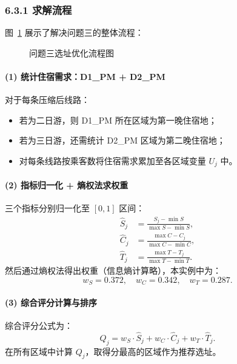 \documentclass[12pt,a4paper]{article}
\begin{document}
\subsubsection*{6.3.1 求解流程} 图~\ref{fig:flow3} 展示了解决问题三的整体流程：
\begin{figure}[H]
\centering
{}
\caption{问题三选址优化流程图}\label{fig:flow3}
\end{figure}

\paragraph{(1) 统计住宿需求：D1\_PM + D2\_PM}
对于每条压缩后线路：
\begin{itemize}
  \item 若为二日游，则 D1\_PM 所在区域为第一晚住宿地；
  \item 若为三日游，还需统计 D2\_PM 区域为第二晚住宿地；
  \item 对每条线路按乘客数将住宿需求累加至各区域变量 $U_j$ 中。
\end{itemize}

\paragraph{(2) 指标归一化 + 熵权法求权重}
三个指标分别归一化至 $[0,1]$ 区间：
\begin{align*}
\hat{S}_j &= \frac{S_j - \min S}{\max S - \min S}, \\
\hat{C}_j &= \frac{\max C - C_j}{\max C - \min C}, \\
\hat{T}_j &= \frac{\max T - T_j}{\max T - \min T}.
\end{align*}
然后通过熵权法得出权重（信息熵计算略），本实例中为：
\[
w_S = 0.372,\quad w_C = 0.342,\quad w_T = 0.287.
\]

\paragraph{(3) 综合评分计算与排序}
综合评分公式为：
\[
Q_j = w_S \cdot \hat{S}_j + w_C \cdot \hat{C}_j + w_T \cdot \hat{T}_j.
\]
在所有区域中计算 $Q_j$，取得分最高的区域作为推荐选址。
\end{document}
